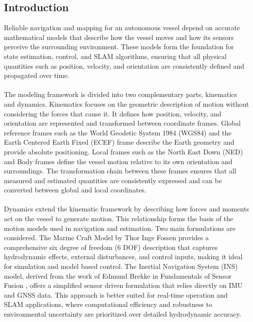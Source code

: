 \subsection{Introduction}
Reliable navigation and mapping for an autonomous vessel depend on accurate mathematical models that describe how the vessel moves and how its sensors perceive the surrounding environment. These models form the foundation for state estimation, control, and SLAM algorithms, ensuring that all physical quantities such as position, velocity, and orientation are consistently defined and propagated over time.  
\\ \\
The modeling framework is divided into two complementary parts, kinematics and dynamics. Kinematics focuses on the geometric description of motion without considering the forces that cause it. It defines how position, velocity, and orientation are represented and transformed between coordinate frames. Global reference frames such as the World Geodetic System 1984 (WGS84) and the Earth Centered Earth Fixed (ECEF) frame describe the Earth geometry and provide absolute positioning. Local frames such as the North East Down (NED) and Body frames define the vessel motion relative to its own orientation and surroundings. The transformation chain between these frames ensures that all measured and estimated quantities are consistently expressed and can be converted between global and local coordinates.
\\ \\
Dynamics extend the kinematic framework by describing how forces and moments act on the vessel to generate motion. This relationship forms the basis of the motion models used in navigation and estimation. Two main formulations are considered. The Marine Craft Model by Thor Inge Fossen \cite{fossen_marine_craft_model} provides a comprehensive six degree of freedom (6 DOF) description that captures hydrodynamic effects, external disturbances, and control inputs, making it ideal for simulation and model based control. The Inertial Navigation System (INS) model, derived from the work of Edmund Brekke in Fundamentals of Sensor Fusion \cite{sensor_fusion_book}, offers a simplified sensor driven formulation that relies directly on IMU and GNSS data. This approach is better suited for real-time operation and SLAM applications, where computational efficiency and robustness to environmental uncertainty are prioritized over detailed hydrodynamic accuracy.  
\\ \\
